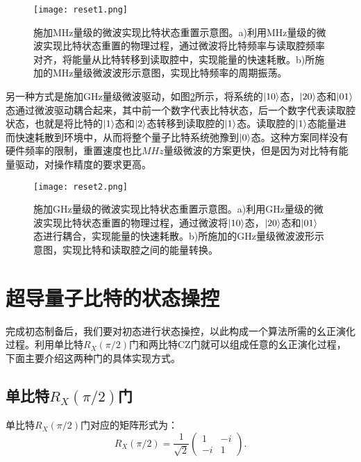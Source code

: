 \begin{figure}[h]
	\centering
	\texttt{[image: reset1.png]}
	\caption{施加MHz量级的微波实现比特状态重置示意图\cite{zhou2021rapid}。a)利用MHz量级的微波实现比特状态重置的物理过程，通过微波将比特频率与读取腔频率对齐，将能量从比特转移到读取腔中，实现能量的快速耗散。b)所施加的MHz量级微波波形示意图，实现比特频率的周期振荡。}
	\label{fig:reset1}
\end{figure}

另一种方式是施加GHz量级微波驱动，如图\ref{fig:reset2}所示，将系统的$\left|10\right>$态，$\left|20\right>$态和$\left|01\right>$态通过微波驱动耦合起来，其中前一个数字代表比特状态，后一个数字代表读取腔状态，也就是将比特的$\left|1\right>$态和$\left|2\right>$态转移到读取腔的$\left|1\right>$态。读取腔的$\left|1\right>$态能量进而快速耗散到环境中，从而将整个量子比特系统弛豫到$\left|0\right>$态。这种方案同样没有硬件频率的限制，重置速度也比$MHz$量级微波的方案更快，但是因为对比特有能量驱动，对操作精度的要求更高。

\begin{figure}[h]
	\centering
	\texttt{[image: reset2.png]}
	\caption{施加GHz量级的微波实现比特状态重置示意图\cite{magnard2018fast}。a)利用GHz量级的微波实现比特状态重置的物理过程，通过微波将$\left|10\right>$态，$\left|20\right>$态和$\left|01\right>$态进行耦合，实现能量的快速耗散。b)所施加的GHz量级微波波形示意图，实现比特和读取腔之间的能量转换。}
	\label{fig:reset2}
\end{figure}

\section{超导量子比特的状态操控}
完成初态制备后，我们要对初态进行状态操控，以此构成一个算法所需的幺正演化过程。利用单比特$R_X(\pi/2)$门和两比特CZ门就可以组成任意的幺正演化过程，下面主要介绍这两种门的具体实现方式。
\subsection{单比特$R_X(\pi/2)$门}
单比特$R_X(\pi/2)$门对应的矩阵形式为：
\begin{equation}
	 R_X(\pi/2)=\frac{1}{\sqrt{2}}\begin{pmatrix}
		1 & -i \\
		-i & 1
	\end{pmatrix}.
\end{equation}

